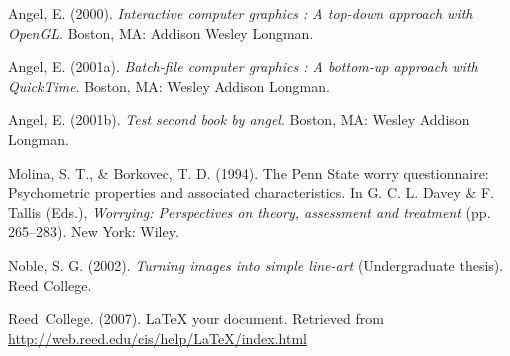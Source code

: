 \documentclass[
  letterpaper,
  12pt,
  twoside]{reedthesis}
\newlength{\cslhangindent}
\newenvironment{CSLReferences}[2] %
 {\begin{list}{}{%
  \setlength{\itemindent}{0pt}
  \setlength{\leftmargin}{0pt}
  \setlength{\parsep}{0pt}
  \ifodd #1
   \setlength{\leftmargin}{\cslhangindent}
   \setlength{\itemindent}{-1\cslhangindent}
  \fi
  \setlength{\itemsep}{#2\baselineskip}}}
 {\end{list}}
\renewenvironment{CSLReferences}[2]
 {\begin{list}{}{%
  \setlength{\itemindent}{0pt}%
  \setlength{\leftmargin}{0pt}%
  \setlength{\parsep}{0pt}%
  \ifodd #1
   \setlength{\leftmargin}{\cslhangindent}%
   \setlength{\itemindent}{-1\cslhangindent}%
  \fi
  \setlength{\itemsep}{12pt plus 2pt minus 2pt}%
  }}
 {\end{list}}
\begin{document}


\noindent
\setlength{\parindent}{-0.20in}
\setlength{\leftskip}{0.20in}
\setlength{\parskip}{8pt}

\label{refs}
\begin{CSLReferences}{1}{0}
Angel, E. (2000). \emph{Interactive computer graphics : A top-down
approach with OpenGL}. Boston, MA: Addison Wesley Longman.

Angel, E. (2001a). \emph{Batch-file computer graphics : A bottom-up
approach with QuickTime}. Boston, MA: Wesley Addison Longman.

Angel, E. (2001b). \emph{Test second book by angel}. Boston, MA: Wesley
Addison Longman.

Molina, S. T., \& Borkovec, T. D. (1994). The {P}enn {S}tate worry
questionnaire: Psychometric properties and associated characteristics.
In G. C. L. Davey \& F. Tallis (Eds.), \emph{Worrying: Perspectives on
theory, assessment and treatment} (pp. 265--283). New York: Wiley.

Noble, S. G. (2002). \emph{Turning images into simple line-art}
(Undergraduate thesis). Reed College.

Reed~College. (2007). LaTeX your document. Retrieved from
\url{http://web.reed.edu/cis/help/LaTeX/index.html}

\end{CSLReferences}
\end{document}
